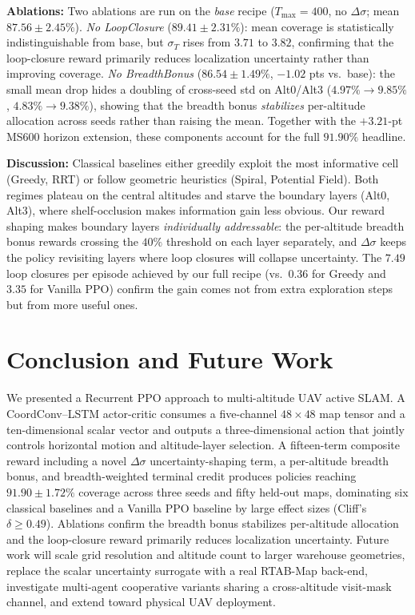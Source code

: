 \documentclass[conference]{IEEEtran}
\begin{document}
\textbf{Ablations:} Two ablations are run on the \emph{base} recipe ($T_{\max}\!=\!400$, no $\Delta\sigma$; mean $87.56\!\pm\!2.45\%$). \emph{No LoopClosure} ($89.41\!\pm\!2.31\%$): mean coverage is statistically indistinguishable from base, but $\sigma_T$ rises from $3.71$ to $3.82$, confirming that the loop-closure reward primarily reduces localization uncertainty rather than improving coverage. \emph{No BreadthBonus} ($86.54\!\pm\!1.49\%$, $-1.02$ pts vs.\ base): the small mean drop hides a doubling of cross-seed std on Alt0/Alt3 ($4.97\%\!\to\!9.85\%$, $4.83\%\!\to\!9.38\%$), showing that the breadth bonus \emph{stabilizes} per-altitude allocation across seeds rather than raising the mean. Together with the $+3.21$-pt MS600 horizon extension, these components account for the full $91.90\%$ headline.

\textbf{Discussion:} Classical baselines either greedily exploit the most informative cell (Greedy, RRT) or follow geometric heuristics (Spiral, Potential Field). Both regimes plateau on the central altitudes and starve the boundary layers (Alt0, Alt3), where shelf-occlusion makes information gain less obvious. Our reward shaping makes boundary layers \emph{individually addressable}: the per-altitude breadth bonus rewards crossing the $40\%$ threshold on each layer separately, and $\Delta\sigma$ keeps the policy revisiting layers where loop closures will collapse uncertainty. The $7.49$ loop closures per episode achieved by our full recipe (vs.\ $0.36$ for Greedy and $3.35$ for Vanilla PPO) confirm the gain comes not from extra exploration steps but from more useful ones.

\section{Conclusion and Future Work}

We presented a Recurrent PPO approach to multi-altitude UAV active SLAM. A CoordConv--LSTM actor-critic consumes a five-channel $48{\times}48$ map tensor and a ten-dimensional scalar vector and outputs a three-dimensional action that jointly controls horizontal motion and altitude-layer selection. A fifteen-term composite reward including a novel $\Delta\sigma$ uncertainty-shaping term, a per-altitude breadth bonus, and breadth-weighted terminal credit produces policies reaching $91.90 \pm 1.72\%$ coverage across three seeds and fifty held-out maps, dominating six classical baselines and a Vanilla PPO baseline by large effect sizes (Cliff's $\delta\!\geq\!0.49$). Ablations confirm the breadth bonus stabilizes per-altitude allocation and the loop-closure reward primarily reduces localization uncertainty. Future work will scale grid resolution and altitude count to larger warehouse geometries, replace the scalar uncertainty surrogate with a real RTAB-Map back-end, investigate multi-agent cooperative variants sharing a cross-altitude visit-mask channel, and extend toward physical UAV deployment.

\balance


\end{document}
